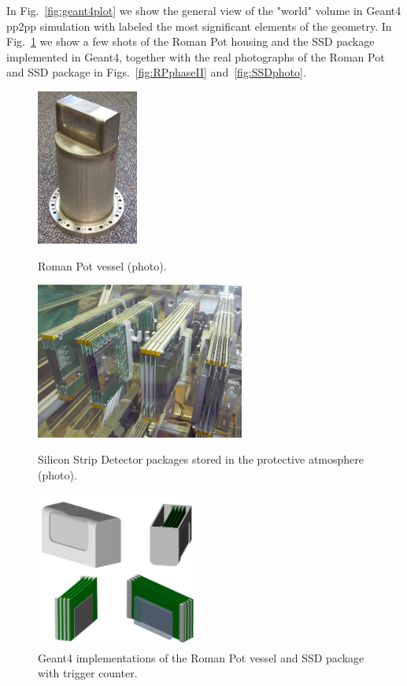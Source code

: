 In Fig.~\ref{fig:geant4plot} we show the general view of the "world" volume in Geant4 pp2pp simulation with labeled the most significant elements of the geometry. In Fig.~\ref{fig:g4Rp} we show a few shots of the Roman Pot housing and the SSD package implemented in Geant4, together with the real photographs of the Roman Pot and SSD package in Figs.~\ref{fig:RPphaseII} and~\ref{fig:SSDphoto}.

\begin{figure}[h]
	\centering
	\parbox{0.2\textwidth}{
		\centering
		\includegraphics[height=145pt]{graphics/rpSim/romanpot.jpg}
		\caption[Roman Pot vessel (photo).]{Roman Pot vessel (photo).\newline}
		\label{fig:RPphoto}
	}%
	\quad%
	\parbox{0.40\textwidth}{
		\centering
		\includegraphics[height=145pt]{graphics/rpSim/SSD.jpg}
		\caption[Silicon Strip Detector packages stored in the protective atmosphere (photo).]{Silicon Strip Detector packages stored in the protective atmosphere (photo).\newline}
		\label{fig:SSDphoto}
	}%
	\quad%
	\parbox{0.33\textwidth}{
		\centering
		\includegraphics[height=145pt]{graphics/rpSim/g4Rp.png}
		\caption{Geant4 implementations of the Roman Pot vessel and SSD package with trigger counter.}
		\label{fig:g4Rp}
	}
\end{figure}

